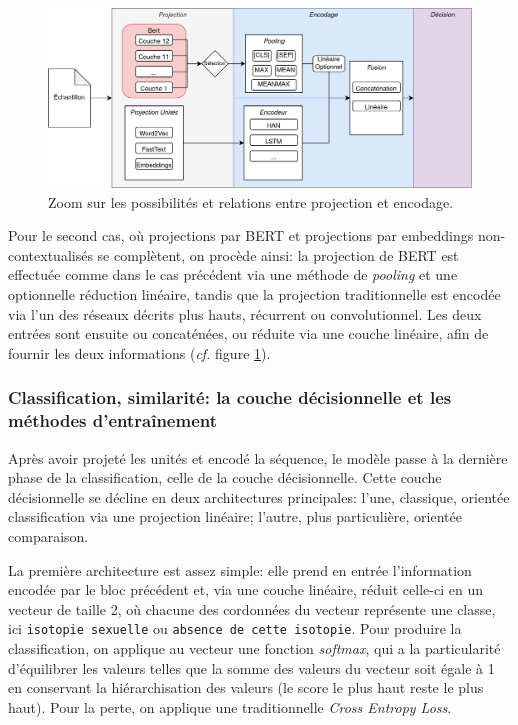 \begin{figure}[ht]
    \centering
    \includegraphics[width=\linewidth]{figures/chap4/BertZoom.png}
    \caption{Zoom sur les possibilités et relations entre projection et encodage.}
    \label{fig:chap4:zoom-projection}
\end{figure}

Pour le second cas, où projections par BERT et projections par embeddings non-contextualisés se complètent, on procède ainsi: la projection de BERT est effectuée comme dans le cas précédent via une méthode de \textit{pooling} et une optionnelle réduction linéaire, tandis que la projection traditionnelle est encodée via l'un des réseaux décrits plus hauts, récurrent ou convolutionnel. Les deux entrées sont ensuite ou concaténées, ou réduite via une couche linéaire, afin de fournir les deux informations (\textit{cf.} figure \ref{fig:chap4:zoom-projection}).

\subsubsection{Classification, similarité: la couche décisionnelle et les méthodes d'entraînement}

Après avoir projeté les unités et encodé la séquence, le modèle passe à la dernière phase de la classification, celle de la couche décisionnelle. Cette couche décisionnelle se décline en deux architectures principales: l'une, classique, orientée classification via une projection linéaire; l'autre, plus particulière, orientée comparaison.

La première architecture est assez simple: elle prend en entrée l'information encodée par le bloc précédent et, via une couche linéaire, réduit celle-ci en un vecteur de taille 2, où chacune des cordonnées du vecteur représente une classe, ici \texttt{isotopie sexuelle} ou \texttt{absence de cette isotopie}. Pour produire la classification, on applique au vecteur une fonction \textit{softmax}, qui a la particularité d'équilibrer les valeurs telles que la somme des valeurs du vecteur soit égale à 1 en conservant la hiérarchisation des valeurs (le score le plus haut reste le plus haut). Pour la perte, on applique une traditionnelle \textit{Cross Entropy Loss}.


